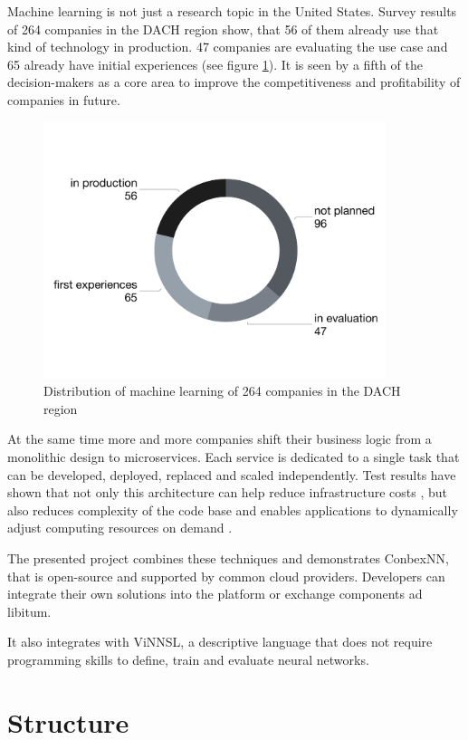 Machine learning is not just a research topic in the United States.
Survey results of 264 companies in the DACH region show, that 56 of them
already use that kind of technology in production. 47 companies are
evaluating the use case and 65 already have initial experiences (see
figure \ref{img.crisp_ml_verbreitung}). It is seen by a fifth of the
decision-makers as a core area to improve the competitiveness and
profitability of companies in future. \cite{crisp}

\begin{figure}
\centering
\includegraphics[width=10.00000cm]{images/crisp_ml_verbreitung}
\caption{Distribution of machine learning of 264 companies in the DACH
region \cite{crisp}\label{img.crisp_ml_verbreitung}}
\end{figure}

At the same time more and more companies shift their business logic from
a monolithic design to microservices. Each service is dedicated to a
single task that can be developed, deployed, replaced and scaled
independently. Test results have shown that not only this architecture
can help reduce infrastructure costs
\cite{villamizar2}\cite{villamizar}, but also reduces complexity of the
code base and enables applications to dynamically adjust computing
resources on demand \cite{villamizar}.

The presented project combines these techniques and demonstrates
ConbexNN, that is open-source and supported by common cloud providers.
Developers can integrate their own solutions into the platform or
exchange components ad libitum.

It also integrates with ViNNSL, a descriptive language that does not
require programming skills to define, train and evaluate neural
networks.

\section{Structure}\label{structure}

